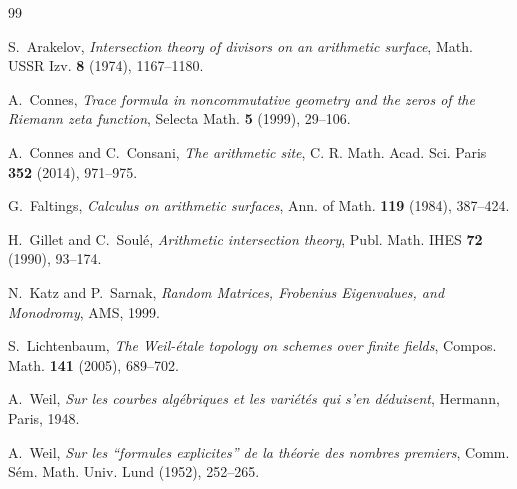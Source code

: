 \documentclass[12pt]{article}
\begin{document}
\begin{thebibliography}{99}

S.~Arakelov, \emph{Intersection theory of divisors on an arithmetic surface},
Math. USSR Izv. \textbf{8} (1974), 1167--1180.

A.~Connes, \emph{Trace formula in noncommutative geometry and the zeros of
the Riemann zeta function}, Selecta Math. \textbf{5} (1999), 29--106.

A.~Connes and C.~Consani, \emph{The arithmetic site},
C. R. Math. Acad. Sci. Paris \textbf{352} (2014), 971--975.

G.~Faltings, \emph{Calculus on arithmetic surfaces},
Ann. of Math. \textbf{119} (1984), 387--424.

H.~Gillet and C.~Soul\'e, \emph{Arithmetic intersection theory},
Publ. Math. IHES \textbf{72} (1990), 93--174.

N.~Katz and P.~Sarnak, \emph{Random Matrices, Frobenius Eigenvalues, and
Monodromy}, AMS, 1999.

S.~Lichtenbaum, \emph{The Weil-\'etale topology on schemes over finite fields},
Compos. Math. \textbf{141} (2005), 689--702.

A.~Weil, \emph{Sur les courbes alg\'ebriques et les vari\'et\'es qui s'en
d\'eduisent}, Hermann, Paris, 1948.

A.~Weil, \emph{Sur les ``formules explicites'' de la th\'eorie des nombres
premiers}, Comm. S\'em. Math. Univ. Lund (1952), 252--265.

\end{thebibliography}
\end{document}
